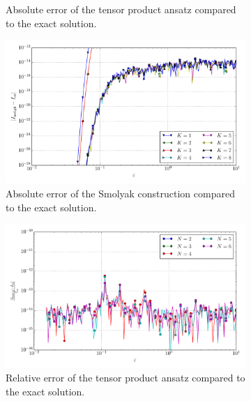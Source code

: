 \documentclass[a4paper,10pt]{article}
\begin{document}
\begin{figure}[ht!]
\begin{subfigure}[t]{0.5\linewidth}
    \caption{Absolute error of the tensor product ansatz compared to the exact solution.}
    \label{fig:tp_sg_4d_conv_eps_3000_3000_err_nsd_tp}
  \end{subfigure}
  \begin{subfigure}[t]{0.5\linewidth}
    \includegraphics[width=\linewidth]{./plots/tp_sg_4d_conv_eps_(3,0,0,0)_(3,0,0,0)_err_nsd_gk.pdf}
    \caption{Absolute error of the Smolyak construction compared to the exact solution.}
    \label{fig:tp_sg_4d_conv_eps_3000_3000_err_nsd_gk}
  \end{subfigure}
  \begin{subfigure}[t]{0.5\linewidth}
    \includegraphics[width=\linewidth]{./plots/tp_sg_4d_conv_eps_(3,0,0,0)_(3,0,0,0)_err_rel_nsd_tp.pdf}
    \caption{Relative error of the tensor product ansatz compared to the exact solution.}
    \label{fig:tp_sg_4d_conv_eps_3000_3000_err_rel_nsd_tp}
  \end{subfigure}
  \begin{subfigure}[t]{0.5\linewidth}

\end{subfigure}
\end{figure}
\end{document}

